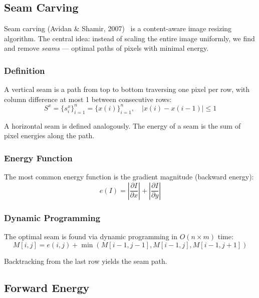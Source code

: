 \documentclass[12pt,a4paper]{article}
\begin{document}
\subsection{Seam Carving}

Seam carving (Avidan \& Shamir, 2007)~\cite{avidan2007} is a content-aware image resizing algorithm. The central idea: instead of scaling the entire image uniformly, we find and remove \emph{seams} — optimal paths of pixels with minimal energy.

\subsubsection{Definition}

A vertical seam is a path from top to bottom traversing one pixel per row, with column difference at most 1 between consecutive rows:
\begin{equation}
    S^x = \{s_i^x\}_{i=1}^n = \{x(i)\}_{i=1}^n, \quad |x(i) - x(i-1)| \leq 1
\end{equation}

A horizontal seam is defined analogously. The energy of a seam is the sum of pixel energies along the path.

\subsubsection{Energy Function}

The most common energy function is the gradient magnitude (backward energy):
\begin{equation}
    e(I) = \left|\frac{\partial I}{\partial x}\right| + \left|\frac{\partial I}{\partial y}\right|
\end{equation}

\subsubsection{Dynamic Programming}

The optimal seam is found via dynamic programming in $O(n \times m)$ time:
\begin{equation}
    M[i,j] = e(i,j) + \min(M[i-1,j-1], M[i-1,j], M[i-1,j+1])
\end{equation}

Backtracking from the last row yields the seam path.

\subsection{Forward Energy}
\end{document}
